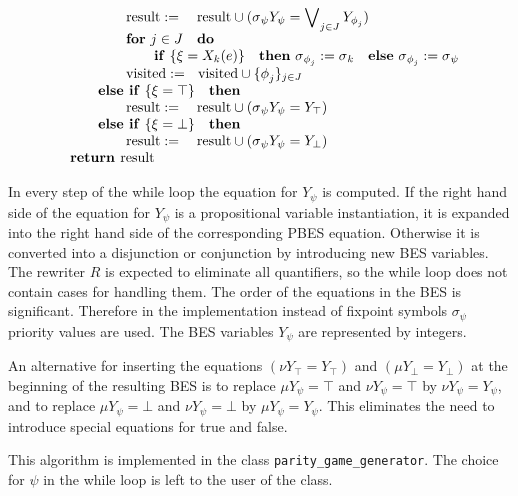 {\begin{equation*}
\begin{array}{l}
\qquad \qquad \text{result}:=\text{ result}\cup (\sigma _{\psi }Y_{\psi
}=\dbigvee_{j\in J}Y_{\phi _{j}}) \\ 
\qquad \qquad \text{\textbf{for} }j\in J\text{ \textbf{do}} \\ 
\qquad \qquad \qquad \text{\textbf{if} }\{\xi =X_{k}(e)\}\text{ \textbf{then}
}\sigma _{\phi _{j}}:=\sigma _{k}\text{ \textbf{else} }\sigma _{\phi
_{j}}:=\sigma _{\psi } \\ 
\qquad \qquad \text{visited}:=\text{visited}\cup \{\phi _{j}\}_{j\in J} \\ 
\qquad \text{\textbf{else if} }\{\xi =\top \}\text{ \textbf{then}} \\ 
\qquad \qquad \text{result}:=\text{ result}\cup (\sigma _{\psi }Y_{\psi
}=Y_{\top }) \\ 
\qquad \text{\textbf{else if} }\{\xi =\bot \}\text{ \textbf{then}} \\ 
\qquad \qquad \text{result}:=\text{ result}\cup (\sigma _{\psi }Y_{\psi
}=Y_{\bot }) \\ 
\text{\textbf{return }result}%
\end{array}%
\end{equation*}%
}

In every step of the while loop the equation for $Y_{\psi }$ is computed. If
the right hand side of the equation for $Y_{\psi }$ is a propositional
variable instantiation, it is expanded into the right hand side of the
corresponding PBES equation. Otherwise it is converted into a disjunction or
conjunction by introducing new BES variables. The rewriter $R$ is expected
to eliminate all quantifiers, so the while loop does not contain cases for
handling them. The order of the equations in the BES is significant.
Therefore in the implementation instead of fixpoint symbols $\sigma _{\psi }$
priority values are used. The BES variables $Y_{\psi }$ are represented by
integers.

An alternative for inserting the equations $(\nu Y_{\top }=Y_{\top })$ and $%
(\mu Y_{\bot }=Y_{\bot })$ at the beginning of the resulting BES is to
replace $\mu Y_{\psi }=\top $ and $\nu Y_{\psi }=\top $ by $\nu Y_{\psi
}=Y_{\psi }$, and to replace $\mu Y_{\psi }=\bot $ and $\nu Y_{\psi }=\bot $
by $\mu Y_{\psi }=Y_{\psi }$. This eliminates the need to introduce special
equations for true and false.

This algorithm is implemented in the class \texttt{parity\_game\_generator}.
The choice for $\psi $ in the while loop is left to the user of the
class.\newpage 
